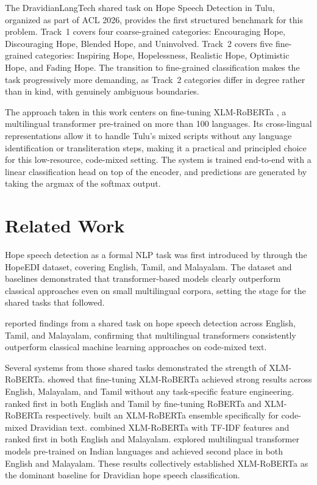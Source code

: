 \documentclass[11pt]{article}
\begin{document}
The DravidianLangTech shared task on Hope
Speech Detection in Tulu, organized as part of ACL
2026, provides the first structured benchmark for
this problem. Track~1 covers four coarse-grained
categories: Encouraging Hope, Discouraging Hope,
Blended Hope, and Uninvolved. Track~2 covers five
fine-grained categories: Inspiring Hope, Hopelessness, Realistic Hope, Optimistic Hope, and Fading
Hope. The transition to fine-grained classification
makes the task progressively more demanding, as
Track~2 categories differ in degree rather than in
kind, with genuinely ambiguous boundaries.

The approach taken in this work centers on fine-tuning XLM-RoBERTa \cite{conneau2020}, a multilingual transformer pre-trained on more than 100 languages.
Its cross-lingual representations allow it to handle
Tulu's mixed scripts without any language identification or transliteration steps, making it a practical
and principled choice for this low-resource, code-mixed setting. The system is trained end-to-end
with a linear classification head on top of the encoder, and predictions are generated by taking the
argmax of the softmax output.

\section{Related Work}

Hope speech detection as a formal NLP task was
first introduced by \citet{chakravarthi2020} through the
HopeEDI dataset, covering English, Tamil, and
Malayalam. The dataset and baselines demonstrated that transformer-based models clearly outperform classical approaches even on small multilingual corpora, setting the stage for the shared
tasks that followed.

\citet{chakravarthi2021findings} reported findings from a shared task on hope speech detection
across English, Tamil, and Malayalam, confirming that multilingual transformers consistently outperform classical machine learning approaches on
code-mixed text.

Several systems from those shared tasks demonstrated the strength of XLM-RoBERTa. \citet{ziehe2021} showed that fine-tuning XLM-RoBERTa
achieved strong results across English, Malayalam,
and Tamil without any task-specific feature engineering. \citet{mahajan2021} ranked first in both English and Tamil by fine-tuning RoBERTa and XLM-RoBERTa respectively. \citet{balouchzahi2021} built
an XLM-RoBERTa ensemble specifically for code-mixed Dravidian text. \citet{huang2021} combined
XLM-RoBERTa with TF-IDF features and ranked
first in both English and Malayalam. \citet{singh2021} explored multilingual transformer models pre-trained on Indian languages and achieved second
place in both English and Malayalam. These results collectively established XLM-RoBERTa as
the dominant baseline for Dravidian hope speech
classification.
\end{document}
